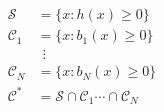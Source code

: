 \documentclass[preview]{standalone}
\begin{document}
\begin{align*}
\mathcal{S} &= \{ x : h(x) \geq 0 \}\\ \mathcal{C}_1 &= \{ x : b_1(x) \geq 0 \}\\ & \ \ \vdots\\  \mathcal{C}_N &= \{ x : b_N(x) \geq 0 \}\\ \mathcal{C}^* &= \mathcal{S} \cap \mathcal{C}_1 \cdots \cap \mathcal{C}_N
\end{align*}
\end{document}
